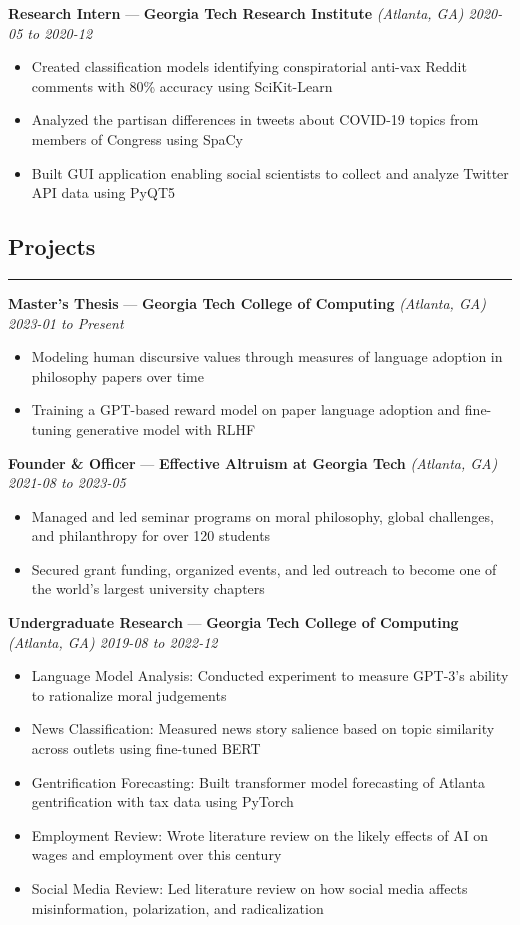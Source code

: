 \documentclass[10pt]{article}
\newcommand{\resumeHeading}[1]{
    \subsection*{#1}
    \hrule
    \vspace*{5pt}
}
\newcommand{\resumeSubHeading}[5]{
    \vspace*{5pt}
    \textbf{#1} — \textbf{#2} \textsl{(#3) \hfill #4 to #5}
}
\begin{document}
\resumeSubHeading
    {Research Intern}
    {Georgia Tech Research Institute}
    {Atlanta, GA}
    {2020-05}
    {2020-12}
\begin{itemize}
    \item Created classification models identifying conspiratorial anti-vax Reddit comments with 80\% accuracy using SciKit-Learn
    \item Analyzed the partisan differences in tweets about COVID-19 topics from members of Congress using SpaCy
    \item Built GUI application enabling social scientists to collect and analyze Twitter API data using PyQT5
\end{itemize}



\resumeHeading{Projects \vspace{-2.5pt}}

\resumeSubHeading
    {Master's Thesis}
    {Georgia Tech College of Computing}
    {Atlanta, GA}
    {2023-01}
    {Present}
\begin{itemize}
    \item Modeling human discursive values through measures of language adoption in philosophy papers over time
    \item Training a GPT-based reward model on paper language adoption and fine-tuning generative model with RLHF
\end{itemize}

\resumeSubHeading
    {Founder \& Officer}
    {Effective Altruism at Georgia Tech}
    {Atlanta, GA}
    {2021-08}
    {2023-05}
\begin{itemize}
    \item Managed and led seminar programs on moral philosophy, global challenges, and philanthropy for over 120 students
    \item Secured grant funding, organized events, and led outreach to become one of the world's largest university chapters
\end{itemize}

\resumeSubHeading
    {Undergraduate Research}
    {Georgia Tech College of Computing}
    {Atlanta, GA}
    {2019-08}
    {2022-12}
\begin{itemize}
    \item Language Model Analysis:
        Conducted experiment to measure GPT-3's ability to rationalize moral judgements
    \item News Classification:
        Measured news story salience based on topic similarity across outlets using fine-tuned BERT
    \item Gentrification Forecasting:
        Built transformer model forecasting of Atlanta gentrification with tax data using PyTorch
    \item Employment Review:
        Wrote literature review on the likely effects of AI on wages and employment over this century
    \item Social Media Review:
        Led literature review on how social media affects misinformation, polarization, and radicalization
\end{itemize}
\end{document}
